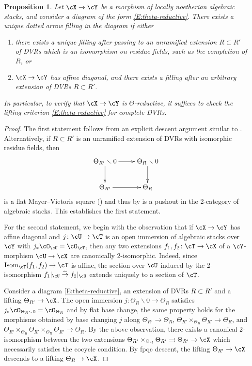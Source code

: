 \documentclass[a4paper]{amsart}
\numberwithin{equation}{section}
\theoremstyle{plain}
\newtheorem{prop}[thm]{Proposition}
\theoremstyle{definition}
\newcommand{\co}{\colon}
\newcommand{\oh}{\cO}
\DeclareMathOperator{\Isom}{Isom}
\newcommand{\iso}{\stackrel{\sim}{\to}}
\begin{document}
\begin{prop} \label{P:theta-reductive-extensions}
Let $ \cX \to \cY$ be a morphism of locally noetherian algebraic stacks, and consider a diagram of the form \eqref{E:theta-reductive}.  There exists a unique dotted arrow filling in the diagram if either
\begin{enumerate}
\item there exists a unique filling after passing to an unramified extension $R \subset R'$ of DVRs which is an isomorphism on residue fields, such as the completion of $R$, or
\item $\cX \to \cY$ has affine diagonal, and there exists a filling after an arbitrary extension of DVRs $R \subset R'$.
\end{enumerate}
In particular, to verify that $\cX \to \cY$ is $\Theta$-reductive, it suffices to check the lifting criterion \eqref{E:theta-reductive} for complete DVRs.  
\end{prop}

\begin{proof} The first statement follows from an explicit descent argument similar to \cite[Rmk.~2.5]{heinloth-stability}.  Alternatively, 
if $R \subset R'$ is an unramified extension of DVRs with isomorphic residue fields, then
$$\xymatrix{
\Theta_{R'} \smallsetminus 0 \ar[r] \ar[d]		& \Theta_{R} \smallsetminus 0 \ar[d] \\
\Theta_{R'} \ar[r]	& \Theta_R
}$$
is a flat Mayer--Vietoris square (\cite[Defn. 1.2]{hall-rydh-mv}) and thus by \cite[Thm. A]{hall-rydh-mv} is a pushout in the 2-category of algebraic stacks.  This establishes the first statement.

For the second statement, we begin with the observation that if $\cX \to \cY$ has affine diagonal and $j \co \cU \to \cT$ is an open immersion of algebraic stacks over $\cY$ with $j_* \oh_{\cU} = \oh_{\cT}$, then any two extensions $f_1, f_2 \co \cT \to \cX$ of a $\cY$-morphism $\cU \to \cX$ are canonically 2-isomorphic.  Indeed, since $\Isom_{\cT}(f_1, f_2) \to \cT$ is affine, the section over $\cU$ induced by the 2-isomorphism $f_1|_{\cU} \iso f_2|_{\cU}$ extends uniquely to a section of $\cT$.

Consider a diagram \eqref{E:theta-reductive}, an extension of DVRs $R \subset R'$ and a lifting $\Theta_{R'} \to \cX$.  The open immersion $j \co \Theta_R \smallsetminus 0 \to \Theta_R$ satisfies $j_* \oh_{ \Theta_R \smallsetminus 0} = \oh_{\Theta_R}$ and by flat base change, the same property holds for the morphisms obtained by base changing $j$ along  $\Theta_{R'} \to \Theta_{R}$, $\Theta_{R'} \times_{\Theta_{R}} \Theta_{R'} \to \Theta_{R}$, and $\Theta_{R'} \times_{\Theta_{R}} \Theta_{R'}  \times_{\Theta_{R}} \Theta_{R'} \to \Theta_{R}$. By the above observation, there exists a canonical 2-isomorphism between the two extensions $\Theta_{R'} \times_{\Theta_{R}} \Theta_{R'}  \rightrightarrows \Theta_{R'} \to \cX$ which necessarily satisfies the cocycle condition.  By fpqc descent, the lifting $\Theta_{R'} \to \cX$ descends to a lifting  $\Theta_{R} \to \cX$.
\end{proof}
\end{document}
